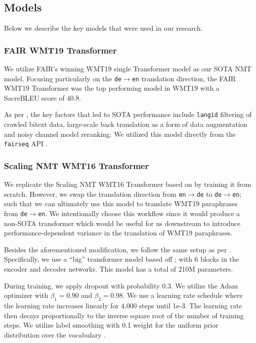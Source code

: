 \documentclass[11pt,a4paper]{article}
\begin{document}
\subsection{Models}

Below we describe the key models that were used in our research.

\subsubsection{FAIR WMT19 Transformer}

We utilize FAIR's winning WMT19 single Transformer model as our SOTA NMT model. Focusing particularly on the \texttt{de$\rightarrow$en} translation direction, the FAIR WMT19 Transformer was the top performing model in WMT19 with a SacreBLEU score of 40.8.

As per \citet{ng2019facebook}, the key factors that led to SOTA performance include \texttt{langid} filtering of crawled bitext data, large-scale back translation as a form of data augmentation and noisy channel model reranking. We utilized this model directly from the \texttt{fairseq} API \cite{ott2019fairseq}. 

\subsubsection{Scaling NMT WMT16 Transformer}

We replicate the Scaling NMT WMT16 Transformer based on \citet{ott2018scaling} by training it from scratch. However, we swap the translation direction from \texttt{en$\rightarrow$de} to \texttt{de$\rightarrow$en}; such that we can ultimately use this model to translate WMT19 paraphrases from \texttt{de$\rightarrow$en}. We intentionally choose this workflow since it would produce a non-SOTA transformer which would be useful for us downstream to introduce performance-dependent variance in the translation of WMT19 paraphrases.

Besides the aforementioned modification, we follow the same setup as per \citet{ott2018scaling}. Specifically, we use a ``big'' transformer model based off \citet{vaswani2017attention}; with 6 blocks in the encoder and decoder networks. This model has a total of 210M parameters.

During training, we apply dropout \cite{srivastava2014dropout} with probability 0.3. We utilize the Adam optimizer \cite{kingma2014adam} with $\beta_1 = 0.90$ and $\beta_2=0.98$. We use a learning rate schedule where the learning rate increases linearly for 4,000 steps until 1e-3. The learning rate then decays proportionally to the inverse square root of the number of training steps. We utilize label smoothing with 0.1 weight for the uniform prior distribution over the vocabulary \cite{pereyra2017regularizing}.
\end{document}
